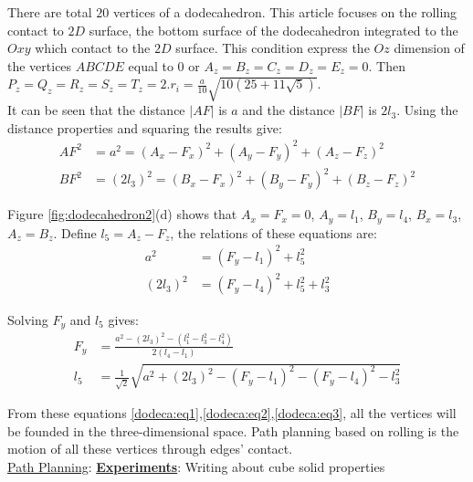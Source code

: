 There are total $20$ vertices of a dodecahedron. This article focuses on the rolling contact to $2D$ surface, the bottom surface of the dodecahedron integrated to the $Oxy$ which contact to the $2D$ surface. This condition express the $Oz$ dimension of the vertices $ABCDE$ equal to $0$ or $A_z = B_z = C_z = D_z = E_z = 0$. Then $P_z = Q_z = R_z = S_z = T_z = 2.r_i = \frac{a}{10}\sqrt{10(25+11\sqrt{5})}$.\\

It can be seen that the distance $|AF|$ is $a$ and the distance $|BF|$ is $2l_3$. Using the distance properties and squaring the results give:
\begin{equation*} 
\label{dodeca:eq1}
\begin{split}
AF^2 & = a^2 = (A_x-F_x)^2 + (A_y-F_y)^2 + (A_z-F_z)^2 \\
BF^2 & = (2l_3)^2 = (B_x-F_x)^2 + (B_y-F_y)^2 + (B_z-F_z)^2
\end{split}
\end{equation*}

Figure \ref{fig:dodecahedron2}(d) shows that $A_x = F_x = 0$, $A_y = l_1$, $B_y = l_4$, $B_x = l_3$, $A_z = B_z$. Define $l_5=A_z-F_z$, the relations of these equations are:
\begin{equation*} 
\label{dodeca:eq2}
\begin{split}
a^2 & = (F_y-l_1)^2 + l_5^2\\
(2l_3)^2 & = (F_y-l_4)^2 + l_5^2 + l_3^2
\end{split}
\end{equation*}

Solving $F_y$ and $l_5$ gives:
\begin{equation*} 
\label{dodeca:eq3}
\begin{split}
F_y & = \frac{a^2-(2l_3)^2-(l_1^2-l_3^2-l_4^2)}{2(l_4-l_1)} \\
l_5 & = \frac{1}{\sqrt{2}}\sqrt{a^2+(2l_3)^2-(F_y-l_1)^2-(F_y-l_4)^2-l_3^2}
\end{split}
\end{equation*}

From these equations \ref{dodeca:eq1},\ref{dodeca:eq2},\ref{dodeca:eq3}, all the vertices will be founded in the three-dimensional space. Path planning based on rolling is the motion of all these vertices through edges' contact.\\

\noindent\uline{Path Planning}: 
%
\newpage
\noindent\uline{\textbf{Experiments}}:
Writing about cube solid properties\\

